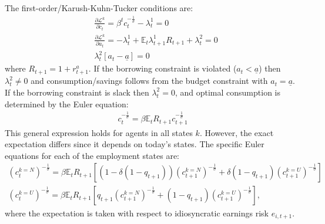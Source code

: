 The first-order/Karush-Kuhn-Tucker conditions are: 
\begin{align*}
&\frac{\partial\mathcal{L}^{k}}{\partial c_{t}}=\beta^{t}c_{t}^{-\frac{1}{\sigma}}-\lambda_{t}^{1} =0 \\
&\frac{\partial\mathcal{L}^{k}}{\partial a_{t}}=-\lambda_{t}^{1}+\mathbb{E}_{t}\lambda_{t+1}^{1}R_{t+1} +\lambda_{t}^{2}= 0 \\
&\lambda_{t}^{2}\left[a_{t}-\underline{a}\right]=0
\end{align*}
where $R_{t+1}=1+r^a_{t+1}$. If the borrowing constraint is violated ($a_{t}<\underline{a}$) then $\lambda_{t}^{2}\neq0$ and consumption/savings follows from the budget constraint with $a_{t}=\underline{a}$. If the borrowing constraint is slack then $\lambda_{t}^{2}=0$, and optimal consumption is determined by the Euler equation: 
\begin{gather*}
c_{t}^{-\frac{1}{\sigma}}=\beta\mathbb{E}_{t}R_{t+1}c_{t+1}^{-\frac{1}{\sigma}}
\end{gather*}
This general expression holds for agents in all states $k$. However, the exact expectation differs since it depends on today's states. The specific Euler equations for each of the employment states are:
\begin{gather*}
\left(c_{t}^{k=N}\right)^{-\frac{1}{\sigma}}=\beta\mathbb{E}_{t}R_{t+1}\left[\left(1-\delta\left(1-q_{t+1}\right)\right)\left(c_{t+1}^{k=N}\right)^{-\frac{1}{\sigma}}+\delta\left(1-q_{t+1}\right)\left(c_{t+1}^{k=U}\right)^{-\frac{1}{\sigma}}\right] \\
\left(c_{t}^{k=U}\right)^{-\frac{1}{\sigma}}=\beta\mathbb{E}_{t}R_{t+1}\left[q_{t+1}\left(c_{t+1}^{k=N}\right)^{-\frac{1}{\sigma}}+(1-q_{t+1})\left(c_{t+1}^{k=U}\right)^{-\frac{1}{\sigma}}\right], 
\end{gather*}
where the expectation is taken with respect to idiosyncratic earnings risk $e_{i,t+1}$. 


